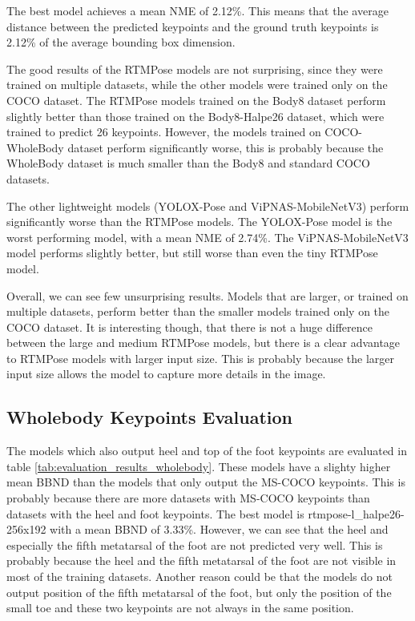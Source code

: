 The best model achieves a mean NME of 2.12\%. This means that the average distance between the predicted keypoints and the ground truth keypoints is 2.12\% of the average bounding box dimension.

The good results of the RTMPose models are not surprising, since they were trained on multiple datasets, while the other models were trained only on the COCO dataset. The RTMPose models trained on the Body8 dataset perform slightly better than those trained on the Body8-Halpe26 dataset, which were trained to predict 26 keypoints. However, the models trained on COCO-WholeBody dataset perform significantly worse, this is probably because the WholeBody dataset is much smaller than the Body8 and standard COCO datasets.

The other lightweight models (YOLOX-Pose and ViPNAS-MobileNetV3) perform significantly worse than the RTMPose models. The YOLOX-Pose model is the worst performing model, with a mean NME of 2.74\%. The ViPNAS-MobileNetV3 model performs slightly better, but still worse than even the tiny RTMPose model.

Overall, we can see few unsurprising results. Models that are larger, or trained on multiple datasets, perform better than the smaller models trained only on the COCO dataset. It is interesting though, that there is not a huge difference between the large and medium RTMPose models, but there is a clear advantage to RTMPose models with larger input size. This is probably because the larger input size allows the model to capture more details in the image.

\subsection{Wholebody Keypoints Evaluation}

The models which also output heel and top of the foot keypoints are evaluated in table \ref{tab:evaluation_results_wholebody}. These models have a slighty higher mean BBND than the models that only output the MS-COCO keypoints. This is probably because there are more datasets with MS-COCO keypoints than datasets with the heel and foot keypoints. The best model is rtmpose-l\_halpe26-256x192 with a mean BBND of 3.33\%. However, we can see that the heel and especially the fifth metatarsal of the foot are not predicted very well. This is probably because the heel and the fifth metatarsal of the foot are not visible in most of the training datasets. Another reason could be that the models do not output position of the fifth metatarsal of the foot, but only the position of the small toe and these two keypoints are not always in the same position.

